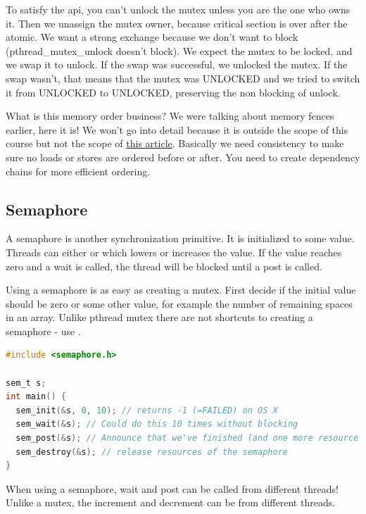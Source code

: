 To satisfy the api, you can't unlock the mutex unless you are the one who owns it.
Then we unassign the mutex owner, because critical section is over after the atomic.
We want a strong exchange because we don't want to block (pthread\_mutex\_unlock doesn't block).
We expect the mutex to be locked, and we swap it to unlock.
If the swap was successful, we unlocked the mutex.
If the swap wasn't, that means that the mutex was UNLOCKED and we tried to switch it from UNLOCKED to UNLOCKED, preserving the non blocking of unlock.

What is this memory order business?
We were talking about memory fences earlier, here it is!
We won't go into detail because it is outside the scope of this course but not the scope of \href{https://gcc.gnu.org/wiki/Atomic/GCCMM/AtomicSync}{this article}.
Basically we need consistency to make sure no loads or stores are ordered before or after.
You need to create dependency chains for more efficient ordering.

\subsection{Semaphore}

A semaphore is another synchronization primitive.
It is initialized to some value.
Threads can either  or  which lowers or increases the value.
If the value reaches zero and a wait is called, the thread will be blocked until a post is called.

Using a semaphore is as easy as creating a mutex.
First decide if the initial value should be zero or some other value, for example the number of remaining spaces in an array.
Unlike pthread mutex there are not shortcuts to creating a semaphore - use .

\begin{lstlisting}[language=C]
#include <semaphore.h>

sem_t s;
int main() {
  sem_init(&s, 0, 10); // returns -1 (=FAILED) on OS X
  sem_wait(&s); // Could do this 10 times without blocking
  sem_post(&s); // Announce that we've finished (and one more resource item is available; increment count)
  sem_destroy(&s); // release resources of the semaphore
}
\end{lstlisting}

When using a semaphore, wait and post can be called from different threads!
Unlike a mutex, the increment and decrement can be from different threads.


